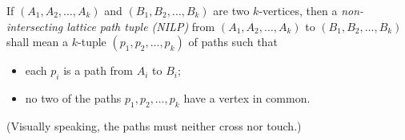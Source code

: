 \documentclass[reqno]{amsart}
\newcommand{\0}{\phantom{c}}
\DeclareMathOperator{\wt}{wt} %
\let\sumnonlimits\sum
\renewcommand{\sum}{\sumnonlimits\limits}
\newcommand{\set}[1]{\left\{ #1 \right\}}
\newcommand{\tup}[1]{\left( #1 \right)}
\newcommand{\defn}[1]{{\color{darkred}\emph{#1}}} %
\theoremstyle{plain}
\theoremstyle{definition}
\numberwithin{equation}{section}
\begin{document}

If $\tup{A_1, A_2, \dotsc, A_k}$ and $\tup{B_1, B_2, \dotsc, B_k}$ are two $k$-vertices, then a \defn{non-intersecting lattice path tuple (NILP)} from $\tup{A_1, A_2, \dotsc, A_k}$ to $\tup{B_1, B_2, \dotsc, B_k}$ shall mean a $k$-tuple $\tup{p_1, p_2, \dotsc, p_k}$ of paths such that
\begin{itemize}
\item each $p_i$ is a path from $A_i$ to $B_i$;
\item no two of the paths $p_1, p_2, \dotsc, p_k$ have a vertex in common.
\end{itemize}
(Visually speaking, the paths must neither cross nor touch.)
\end{document}
